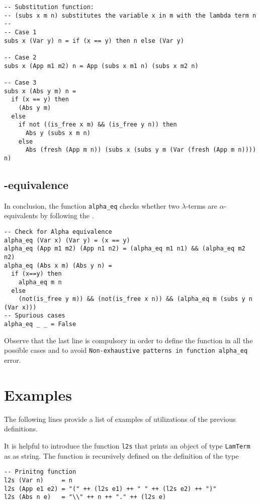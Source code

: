 \documentclass[a4paper,11pt]{article}
\theoremstyle{definition}
\begin{document}
\begin{verbatim}
-- Substitution function:
-- (subs x m n) substitutes the variable x in m with the lambda term n
--
-- Case 1
subs x (Var y) n = if (x == y) then n else (Var y)

-- Case 2
subs x (App m1 m2) n = App (subs x m1 n) (subs x m2 n)

-- Case 3
subs x (Abs y m) n = 
  if (x == y) then 
    (Abs y m) 
  else 
    if not ((is_free x m) && (is_free y n)) then 
      Abs y (subs x m n)
    else 
      Abs (fresh (App m n)) (subs x (subs y m (Var (fresh (App m n)))) n)

\end{verbatim}

\subsection{\alpha-equivalence}

In conclusion, the function \texttt{alpha\_eq} checks whether two $\lambda$-terms are
$\alpha$-equivalents by following the . 

\begin{verbatim}
-- Check for Alpha equivalence
alpha_eq (Var x) (Var y) = (x == y)
alpha_eq (App m1 m2) (App n1 n2) = (alpha_eq m1 n1) && (alpha_eq m2 n2)
alpha_eq (Abs x m) (Abs y n) = 
  if (x==y) then 
    alpha_eq m n
  else
    (not(is_free y m)) && (not(is_free x n)) && (alpha_eq m (subs y n (Var x)))
-- Spurious cases
alpha_eq _ _ = False
\end{verbatim}
Observe that the last line is compulsory in order to define the function in all
the possible cases and to avoid
\texttt{Non-exhaustive patterns in function alpha\_eq} error. 
\section{Examples}
The following lines provide a list of examples of utilizations of the
previous definitions.

It is helpful to introduce the function \texttt{l2s} that prints an object of
type \texttt{LamTerm} as as string. The function is recursively defined on
the definition of the type
\begin{verbatim}
-- Prinitng function
l2s (Var n)     = n
l2s (App e1 e2) = "(" ++ (l2s e1) ++ " " ++ (l2s e2) ++ ")"
l2s (Abs n e)   = "\\" ++ n ++ "." ++ (l2s e)
\end{verbatim}
\end{document}

